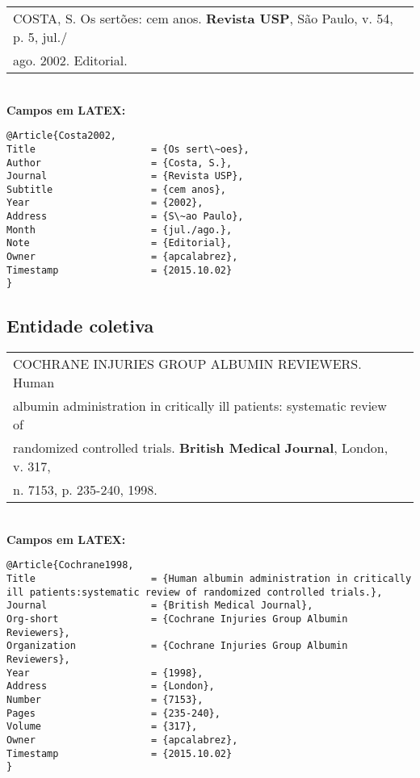 \begin{tabular}{|l|c|} \hline
	COSTA, S. Os sert\~oes: cem anos. \textbf{Revista USP}, S\~ao Paulo, v. 54, p. 5, jul./\\ago. 2002. Editorial.\\\hline
\end{tabular} \\

\textbf{Campos em LATEX:} 

\begin{verbatim}
@Article{Costa2002,
Title                    = {Os sert\~oes},
Author                   = {Costa, S.},
Journal                  = {Revista USP},
Subtitle                 = {cem anos},
Year                     = {2002},
Address                  = {S\~ao Paulo},
Month                    = {jul./ago.},
Note                     = {Editorial},
Owner                    = {apcalabrez},
Timestamp                = {2015.10.02}
}
\end{verbatim}

\subsection{Entidade coletiva}

\begin{tabular}{|l|c|} \hline
	COCHRANE INJURIES GROUP ALBUMIN REVIEWERS. Human \\albumin administration in critically ill patients: systematic review of \\randomized controlled trials. \textbf{British Medical} \textbf{Journal}, London, v. 317, \\n. 7153, p. 235-240, 1998. 
	\\\hline
\end{tabular} \\

\textbf{Campos em LATEX:} 

\begin{verbatim}
@Article{Cochrane1998,
Title                    = {Human albumin administration in critically 
ill patients:systematic review of randomized controlled trials.},
Journal                  = {British Medical Journal},
Org-short                = {Cochrane Injuries Group Albumin Reviewers},
Organization             = {Cochrane Injuries Group Albumin Reviewers},
Year                     = {1998},
Address                  = {London},
Number                   = {7153},
Pages                    = {235-240},
Volume                   = {317},
Owner                    = {apcalabrez},
Timestamp                = {2015.10.02}
}
\end{verbatim}

